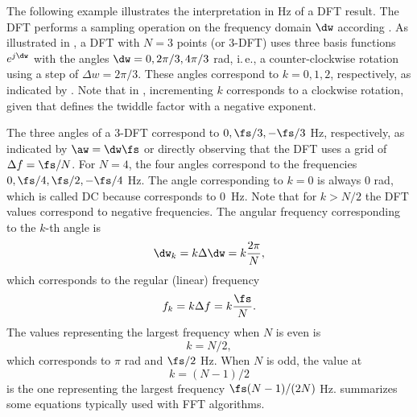 The following example illustrates the interpretation in Hz of a DFT result.
The DFT performs a sampling operation on the frequency domain $\dw$ according . As illustrated in , a DFT with $N=3$ points (or 3-DFT) uses three basis functions $e^{j\dw}$ with the angles $\dw=0, 2\pi/3, 4\pi/3$ rad, i.\,e., a counter-clockwise rotation using a step of $\Delta w = 2 \pi/3$. These angles correspond to $k=0,1,2$, respectively, as indicated by . Note that in , incrementing $k$ corresponds to a clockwise rotation, given that  defines the twiddle factor with a negative exponent.

The three angles of a 3-DFT correspond to $0, \fs/3, -\fs/3$ Hz, respectively, as indicated by $\aw = \dw \fs$ or directly observing that the DFT uses a grid of $\Delta f = \fs/N$. For $N=4$, the four angles correspond to the frequencies $0, \fs/4, \fs/2, -\fs/4$ Hz. The angle corresponding to $k=0$ is always 0 rad, which is called DC because corresponds to 0~Hz. Note that for $k>N/2$ the DFT values correspond to negative frequencies.
The angular frequency corresponding to the $k$-th angle is
\begin{equation}
\dw_k = k \Delta \dw = k \frac{2 \pi }{N},
\label{eq:fft_freq_tone_rad}
\end{equation}
which corresponds to the regular (linear) frequency
\begin{equation}
f_k = k \Delta f = k \frac{\fs}{N}.
\label{eq:fft_freq_tone_hz}
\end{equation}
The values representing the largest frequency when $N$ is even is
\begin{equation}
k=N/2
\label{eq:fft_max_even},
\end{equation}
which corresponds to $\pi$ rad and $\fs/2$ Hz. When $N$ is odd, the value at
\begin{equation}
k=(N-1)/2
\label{eq:fft_max_odd}
\end{equation}
is the one representing the largest frequency $\fs (N-1)/(2 N)$ Hz.  summarizes some equations typically used with FFT algorithms.

